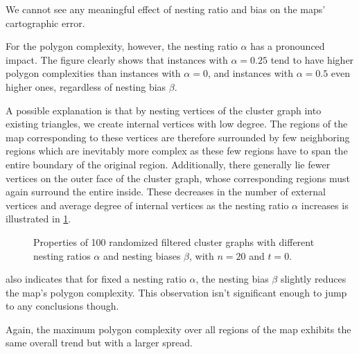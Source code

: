 We cannot see any meaningful effect of nesting ratio and bias on the maps' cartographic error.

For the polygon complexity, however, the nesting ratio $\alpha$ has a pronounced impact.
The figure clearly shows that instances with $\alpha = 0.25$ tend to have higher polygon complexities than instances with $\alpha = 0$, and instances with $\alpha = 0.5$ even higher ones, regardless of nesting bias $\beta$.

A possible explanation is that by nesting vertices of the cluster graph into existing triangles, we create internal vertices with low degree.
The regions of the map corresponding to these vertices are therefore surrounded by few neighboring regions which are inevitably more complex as these few regions have to span the entire boundary of the original region.
Additionally, there generally lie fewer vertices on the outer face of the cluster graph, whose corresponding regions must again surround the entire inside.
These decreases in the number of external vertices and average degree of internal vertices as the nesting ratio $\alpha$ increases is illustrated in \cref{fig:experimental-evaluation-variable-nesting-ratio-and-bias-2}.

\begin{figure}[H]
	\centering
	\quad
	\caption{Properties of 100 randomized filtered cluster graphs  with different nesting ratios $\alpha$ and nesting biases $\beta$, with $n = 20$ and $t = 0$.}
	\label{fig:experimental-evaluation-variable-nesting-ratio-and-bias-2}
\end{figure}

 also indicates that for fixed a nesting ratio $\alpha$, the nesting bias $\beta$ slightly reduces the map's polygon complexity.
This observation isn't significant enough to jump to any conclusions though.

Again, the maximum polygon complexity over all regions of the map exhibits the same overall trend but with a larger spread.
